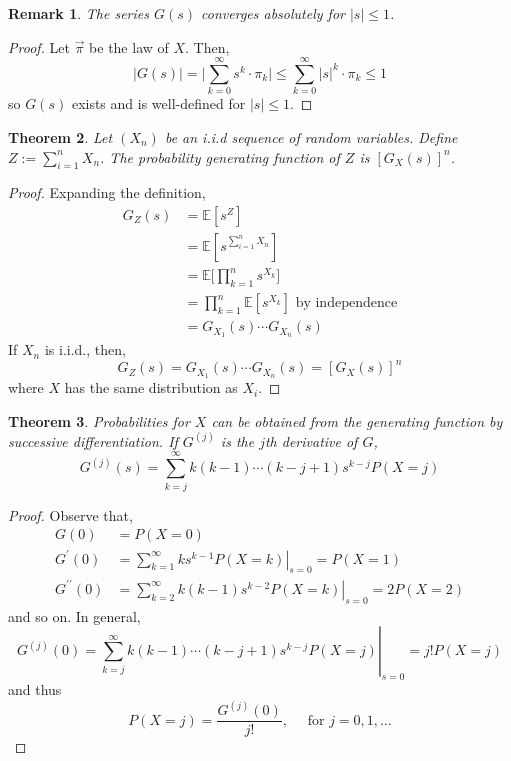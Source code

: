 \documentclass{tufte-handout}
\newtheorem{thm}{Theorem}
\newtheorem{rmk}[thm]{Remark}
\begin{document}
\begin{rmk}
  The series $G(s)$ converges absolutely for $|s| \leq 1$.
\end{rmk}

\begin{proof}
  Let $\Vec{\pi}$ be the law of $X$. Then,
  \[|G(s)| = \bigg|\sum_{k=0}^{\infty} s^k \cdot \pi_k \bigg| \leq \sum_{k=0}^{\infty} |s|^k \cdot \pi_k \leq 1\]
  \noindent so $G(s)$ exists and is well-defined for $|s| \leq 1$.
\end{proof}

\begin{thm}
  Let $(X_n)$ be an i.i.d sequence of random variables. Define $Z := \sum_{i = 1}^n X_n$. The probability generating function of $Z$ is $[G_X(s)]^n$.
\end{thm}

\begin{proof}
  Expanding the definition,
  \begin{align*}
    G_Z(s) &= \mathbb{E}[s^Z] \\
           &= \mathbb{E}[s^{\sum_{i = 1}^n X_n}] \\
           &= \mathbb{E}\bigg[\prod_{k=1}^{n} s^{X_{k}}\bigg] \\
           &= \prod_{k=1}^{n} \mathbb{E}[s^{X_{k}}] \text{ by independence} \\
           &= G_{X_{1}}(s) \cdots G_{X_{n}}(s) 
  \end{align*}
  \noindent If $X_n$ is i.i.d., then,
  \[G_{Z}(s)=G_{X_{1}}(s) \cdots G_{X_{n}}(s)=\left[G_{X}(s)\right]^{n}\]
  \noindent where $X$ has the same distribution as $X_i$.
\end{proof}

\begin{thm}
  Probabilities for $X$ can be obtained from the generating function by successive differentiation.  If $G^{(j)}$ is the $j$th derivative of $G$,
  \[G^{(j)}(s)=\sum_{k=j}^{\infty} k(k-1) \cdots(k-j+1) s^{k-j} P(X=j)\]
\end{thm}

\begin{proof}
  Observe that,
  $$
  \begin{aligned}
  G(0) &=P(X=0) \\
  G^{\prime}(0) &=\left.\sum_{k=1}^{\infty} k s^{k-1} P(X=k)\right|_{s=0}=P(X=1) \\
  G^{\prime \prime}(0) &=\left.\sum_{k=2}^{\infty} k(k-1) s^{k-2} P(X=k)\right|_{s=0}=2 P(X=2)
  \end{aligned}
  $$
  and so on. In general,
  $$
  G^{(j)}(0)=\left.\sum_{k=j}^{\infty} k(k-1) \cdots(k-j+1) s^{k-j} P(X=j)\right|_{s=0}=j ! P(X=j)
  $$
  and thus
  $$
  P(X=j)=\frac{G^{(j)}(0)}{j !}, \quad \text { for } j=0,1, \ldots
  $$
\end{proof}
\end{document}
